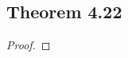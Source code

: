 \documentclass[../../main.tex]{subfiles}
\begin{document}
\subsection{Theorem 4.22}
\begin{wts}

\end{wts}
\begin{proof}

\end{proof}
\end{document}
